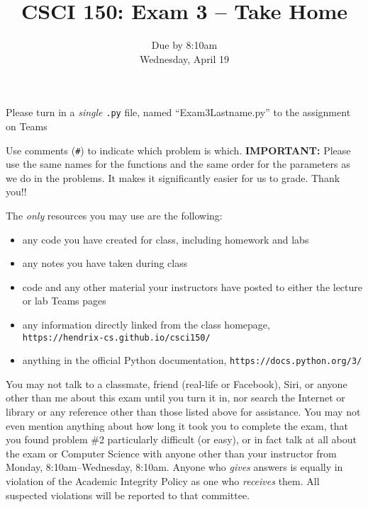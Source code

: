 \documentclass{article}
\begin{document}
\title{CSCI 150: Exam 3 -- Take Home}
\author{}
\date{Due by 8:10am\\Wednesday, April 19}

\maketitle

\thispagestyle{empty}

Please turn in a \emph{single} \texttt{.py} file, named ``Exam3Lastname.py'' to the assignment on Teams



Use comments (\verb|#|) to indicate which problem is
which. \textbf{IMPORTANT:} Please use the same names for the functions
and the same order for the parameters as we do in the problems. It makes it significantly easier for us to grade. Thank you!!

The \emph{only} resources you may use are the following:
\begin{itemize}
  \item  any code you have created for class, including homework and labs
  \item  any notes you have taken during class
  \item  code and any other material your instructors have posted to either the lecture or lab Teams pages
  \item  any information directly linked from the class homepage, \\ \texttt{https://hendrix-cs.github.io/csci150/}
  \item  anything in the official Python documentation, \texttt{https://docs.python.org/3/}
\end{itemize}

 You may not talk to a classmate, friend (real-life or Facebook), Siri, or anyone other than me about this exam until you turn it in, nor search the Internet or library or any reference other than those listed above for assistance.  You may not even mention anything about how long it took you to complete the exam, that you found problem \#2 particularly difficult (or easy), or in fact talk at all about the exam or Computer Science with anyone other than your instructor from Monday, 8:10am--Wednesday, 8:10am.  Anyone who \emph{gives} answers is equally in violation of the Academic Integrity Policy as one who \emph{receives} them. All suspected violations will be reported to that committee.



\newpage
\end{document}

